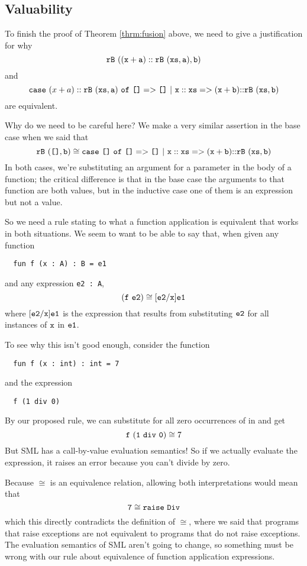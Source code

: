 \documentclass[11pt]{article}
\begin{document}
\subsection{Valuability}
To finish the proof of Theorem \ref{thrm:fusion} above, we need to give a
justification for why
$${\mathtt{rB}}~{\mathtt{((x+a)::{\mathtt{rB}}~{\mathtt{(xs,a)}},b)}}$$ and $$\mathtt{case}~{(x+a)
  ::{\mathtt{rB}}~{\mathtt{(xs,a)}}}~\mathtt{of}~{\texttt{[]}} => {\texttt{[]}}~|~{\mathtt{x::xs}} => {\mathtt{(x+{b})}\mathtt{::}{\mathtt{rB}}~{\mathtt{(xs,{b})}}}$$ are equivalent.

Why do we need to be careful here? We make a very similar assertion in the
base case when we said
that $${{\mathtt{rB}}~{\mathtt{(\texttt{[]},b)}}} \cong {\mathtt{case}~{\texttt{[]}}~\mathtt{of}~{\texttt{[]}} => {\texttt{[]}}~|~{\mathtt{x::xs}} => {\mathtt{(x+{b})}\mathtt{::}{\mathtt{rB}}~{\mathtt{(xs,{b})}}}}$$ In both cases, we're
substituting an argument for a parameter in the body of a function; the
critical difference is that in the base case the arguments to that function
are both values, but in the inductive case one of them is an expression but
not a value.

So we need a rule stating to what a function application is equivalent that
works in both situations. We seem to want to be able to say that, when
given any function
\begin{verbatim}
  fun f (x : A) : B = e1
\end{verbatim}
and any expression \texttt{e2 : A}, $${({\mathtt{f}}~{\mathtt{e2}})} \cong {\mathtt{[e2/x]e1}}$$ where $\mathtt{[e2/x]e1}$ is the expression that results
from substituting $\mathtt{e2}$ for all instances of $\mathtt{x}$ in
$\mathtt{e1}$.

To see why this isn't good enough, consider the function
\begin{verbatim}
  fun f (x : int) : int = 7
\end{verbatim}
and the expression
\begin{verbatim}
  f (1 div 0)
\end{verbatim}
By our proposed rule, we can substitute for all zero occurrences of 
in  and get $${{\mathtt{f}}~{\mathtt{(1 ~div ~0)}}} \cong {7}$$ But SML has a
call-by-value evaluation semantics! So if we actually evaluate the
expression, it raises an error because you can't divide by zero.

Because $\cong$ is an equivalence relation, allowing both interpretations
would mean that $${\mathtt{7}} \cong {\mathtt{raise ~Div}}$$ which this directly
contradicts the definition of $\cong$, where we said that programs that
raise exceptions are not equivalent to programs that do not raise
exceptions. The evaluation semantics of SML aren't going to change, so
something must be wrong with our rule about equivalence of function
application expressions.
\end{document}
